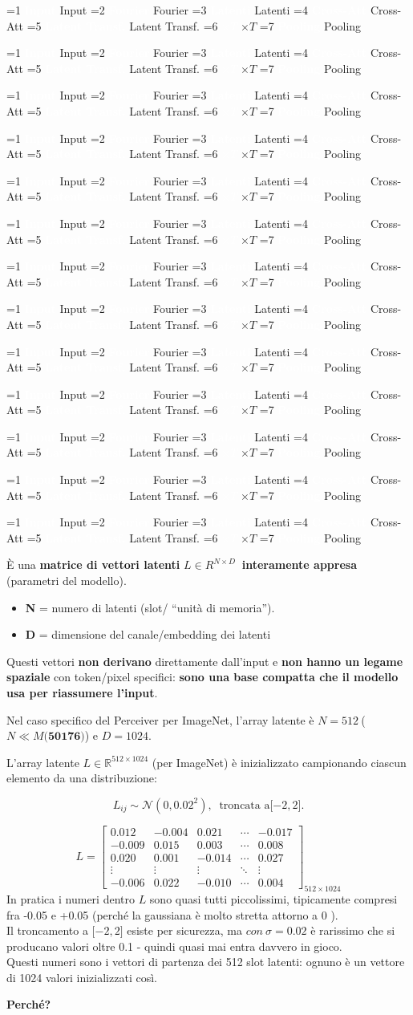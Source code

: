 \documentclass[
  11pt,
]{article}
\newcommand{\pipelinestep}[2]{%
  \ifnum#2=1
    \tikz[baseline=(n.base)]{\node[draw=seccolor, fill=seccolor!15, rounded corners=2pt,
      inner sep=2pt, font=\footnotesize\bfseries] (n) {#1};}%
  \else
    \tikz[baseline=(n.base)]{\node[draw=boxframe, rounded corners=2pt,
      inner sep=2pt, font=\footnotesize] (n) {#1};}%
  \fi
}
\newcommand{\parr}{{\footnotesize\;$\to$\;}}
\newcommand{\pipeline}[1]{%
\begin{tcolorbox}[colback=white, colframe=seccolor!60, boxrule=0.6pt, arc=4pt,
  left=4pt, right=4pt, top=5pt, bottom=5pt, title={\footnotesize\bfseries\color{white} Forward Pass Pipeline}, fonttitle=\footnotesize, coltitle=white, colbacktitle=seccolor!70]
\centering
\pipelinestep{Input}{%
  \ifnum#1=1 1\else 0\fi}%
\parr\pipelinestep{Fourier}{%
  \ifnum#1=2 1\else 0\fi}%
\parr\pipelinestep{Embedding}{%
  \ifnum#1=3 1\else 0\fi}%
\parr\pipelinestep{Latent Array}{%
  \ifnum#1=4 1\else 0\fi}%
\parr\pipelinestep{Cross-Att}{%
  \ifnum#1=5 1\else 0\fi}%
\parr\pipelinestep{Res+MLP}{%
  \ifnum#1=6 1\else 0\fi}%
\\[4pt]
\pipelinestep{Latent Transf.}{%
  \ifnum#1=7 1\else 0\fi}%
\parr\pipelinestep{Res+MLP}{%
  \ifnum#1=8 1\else 0\fi}%
\parr\pipelinestep{$\times T$}{%
  \ifnum#1=9 1\else 0\fi}%
\parr\pipelinestep{Pooling}{%
  \ifnum#1=10 1\else 0\fi}%
\parr\pipelinestep{Classifier}{%
  \ifnum#1=11 1\else 0\fi}%
\parr\pipelinestep{Loss}{%
  \ifnum#1=12 1\else 0\fi}%
\end{tcolorbox}
}
\newcommand{\mystripchip}[3]{%
  \setlength{\fboxsep}{2.8pt}%
  \ifnum#3=#1\relax
    \colorbox{seccolor}{\textcolor{white}{\bfseries #2}}%
  \else
    \colorbox{seccolor!8}{\textcolor{seccolor!55}{#2}}%
  \fi}
\newcommand{\mystriparr}{{\fontsize{8}{8}\selectfont\;\textcolor{seccolor!45}{$\rightarrow$}\;}}
\newcommand{\mystrip}[1]{%
\begin{center}
{\sffamily\fontsize{7.5}{9}\selectfont
\mystripchip{1}{Input}{#1}\mystriparr\mystripchip{2}{Fourier}{#1}\mystriparr\mystripchip{3}{Latenti}{#1}\mystriparr%
\mystripchip{4}{Cross-Att}{#1}\mystriparr\mystripchip{5}{Latent Transf.}{#1}\mystriparr%
\mystripchip{6}{$\times T$}{#1}\mystriparr\mystripchip{7}{Pooling}{#1}}
\end{center}}
\renewcommand{\pipeline}[1]{%
  \ifcase#1\relax
    \mystrip{0}%
    \or\mystrip{1}%
    \or\mystrip{2}%
    \or\mystrip{2}%
    \or\mystrip{3}%
    \or\mystrip{4}%
    \or\mystrip{4}%
    \or\mystrip{5}%
    \or\mystrip{5}%
    \or\mystrip{6}%
    \or\mystrip{7}%
    \or\mystrip{7}%
    \or\mystrip{7}%
  \fi}
\begin{document}
\pipeline{4}

È una \textbf{matrice di vettori latenti} \(L \in R^{N \times D}\ \)
\textbf{interamente appresa} (parametri del modello).

\begin{itemize}
\item
  \textbf{N} = numero di latenti (slot/ ``unità di memoria'').
\item
  \textbf{D} = dimensione del canale/embedding dei latenti
\end{itemize}

Questi vettori \textbf{non derivano} direttamente dall'input e
\textbf{non hanno un legame spaziale} con token/pixel specifici:
\textbf{sono una base compatta che il modello usa per \textbf{riassumere}
l'input}.

Nel caso specifico del Perceiver per ImageNet, l'array
latente è \(N = 512\ \)(\(N \ll M(\mathbf{50176)}\)) e \(D = 1024\).

L'array latente \(L \in \mathbb{R}^{512 \times 1024}\)
(per ImageNet) è inizializzato campionando ciascun elemento da una
distribuzione:

\[L_{ij} \sim \mathcal{N}\left( 0,{0.02}^{2} \right),\ \text{ troncata a}\lbrack - 2,2\rbrack.\]

\[
L = \begin{bmatrix}
 0.012  & -0.004 &  0.021 & \cdots & -0.017 \\
-0.009  &  0.015 &  0.003 & \cdots &  0.008 \\
 0.020  &  0.001 & -0.014 & \cdots &  0.027 \\
\vdots  & \vdots & \vdots & \ddots & \vdots \\
-0.006  &  0.022 & -0.010 & \cdots &  0.004
\end{bmatrix}_{512 \times 1024}
\]In
pratica i numeri dentro \(L\) sono quasi tutti piccolissimi, tipicamente
compresi fra -0.05 e +0.05 (perché la gaussiana è molto stretta attorno
a 0 ).\\
Il troncamento a \(\lbrack - 2,2\rbrack\) esiste per sicurezza, ma
\(con\ \sigma = 0.02\) è rarissimo che si producano valori oltre 0.1 -
quindi quasi mai entra davvero in gioco.\\
Questi numeri sono i vettori di partenza dei 512 slot latenti: ognuno è
un vettore di 1024 valori inizializzati così.

\textbf{Perché?}
\end{document}
